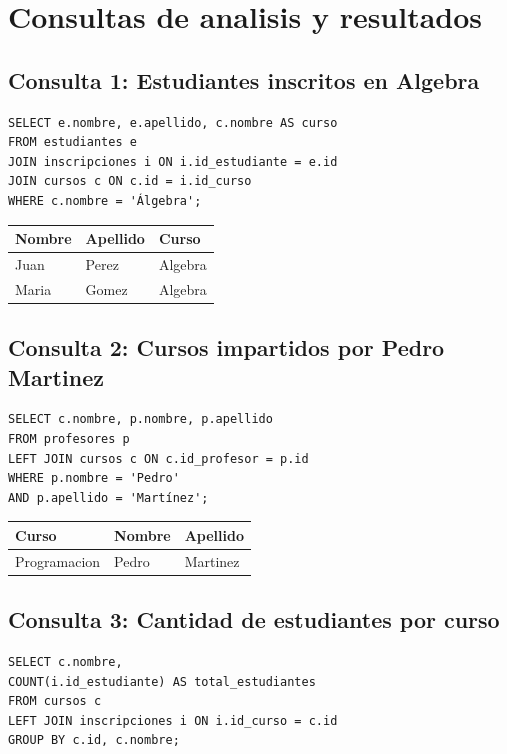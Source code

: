 \documentclass[12pt,a4paper]{article}
\begin{document}
\section{Consultas de analisis y resultados}

\subsection{Consulta 1: Estudiantes inscritos en Algebra}

\begin{lstlisting}
SELECT e.nombre, e.apellido, c.nombre AS curso
FROM estudiantes e
JOIN inscripciones i ON i.id_estudiante = e.id
JOIN cursos c ON c.id = i.id_curso
WHERE c.nombre = 'Álgebra';
\end{lstlisting}

\begin{center}
\begin{tabular}{|l|l|l|}
\hline
Nombre & Apellido & Curso \\
\hline
Juan & Perez & Algebra \\
Maria & Gomez & Algebra \\
\hline
\end{tabular}
\end{center}

\subsection{Consulta 2: Cursos impartidos por Pedro Martinez}

\begin{lstlisting}
SELECT c.nombre, p.nombre, p.apellido
FROM profesores p
LEFT JOIN cursos c ON c.id_profesor = p.id
WHERE p.nombre = 'Pedro'
AND p.apellido = 'Martínez';
\end{lstlisting}

\begin{center}
\begin{tabular}{|l|l|l|}
\hline
Curso & Nombre & Apellido \\
\hline
Programacion & Pedro & Martinez \\
\hline
\end{tabular}
\end{center}

\subsection{Consulta 3: Cantidad de estudiantes por curso}

\begin{lstlisting}
SELECT c.nombre,
COUNT(i.id_estudiante) AS total_estudiantes
FROM cursos c
LEFT JOIN inscripciones i ON i.id_curso = c.id
GROUP BY c.id, c.nombre;
\end{lstlisting}
\end{document}
